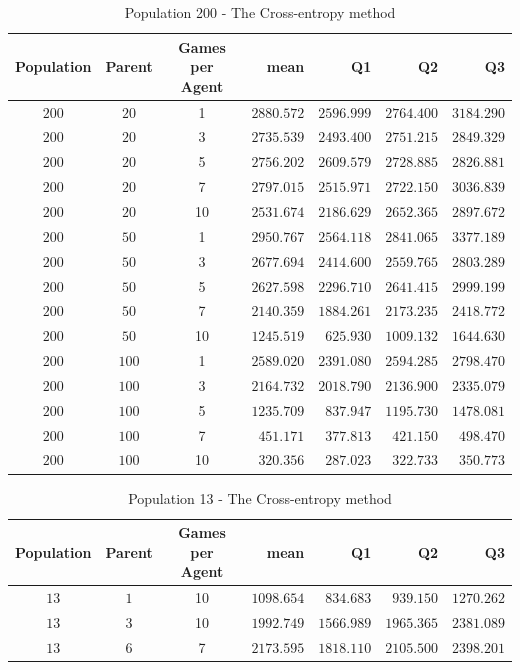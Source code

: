 \begin{table}[H]
\centering
\small
\begin{tabular}{c c c r r r r}
Population & Parent & Games per Agent & mean & Q1 & Q2 & Q3\\
\hline
\hdashline
$200$ & $20$ & 1 & $2880.572$ & $2596.999$ & $2764.400$ & $3184.290$\\
\hdashline
$200$ & $20$ & 3 & $2735.539$ & $2493.400$ & $2751.215$ & $2849.329$\\
$200$ & $20$ & 5 & $2756.202$ & $2609.579$ & $2728.885$ & $2826.881$\\
$200$ & $20$ & 7 & $2797.015$ & $2515.971$ & $2722.150$ & $3036.839$\\
$200$ & $20$ & 10 & $2531.674$ & $2186.629$ & $2652.365$ & $2897.672$\\
\hdashline
$200$ & $50$ & 1 & $2950.767$ & $2564.118$ & $2841.065$ & $3377.189$\\
\hdashline
$200$ & $50$ & 3 & $2677.694$ & $2414.600$ & $2559.765$ & $2803.289$\\
$200$ & $50$ & 5 & $2627.598$ & $2296.710$ & $2641.415$ & $2999.199$\\
$200$ & $50$ & 7 & $2140.359$ & $1884.261$ & $2173.235$ & $2418.772$\\
$200$ & $50$ & 10 & $1245.519$ & $625.930$ & $1009.132$ & $1644.630$\\
\hdashline
$200$ & $100$ & 1 & $2589.020$ & $2391.080$ & $2594.285$ & $2798.470$\\
\hdashline
$200$ & $100$ & 3 & $2164.732$ & $2018.790$ & $2136.900$ & $2335.079$\\
$200$ & $100$ & 5 & $1235.709$ & $837.947$ & $1195.730$ & $1478.081$\\
$200$ & $100$ & 7 & $451.171$ & $377.813$ & $421.150$ & $498.470$\\
$200$ & $100$ & 10 & $320.356$ & $287.023$ & $322.733$ & $350.773$\\
\end{tabular}
\caption{Population 200 - The Cross-entropy method}
\end{table}

\clearpage

\begin{table}[H]
\centering
\small
\begin{tabular}{c c c r r r r}
Population & Parent & Games per Agent & mean & Q1 & Q2 & Q3\\
\hline
$13$ & $1$ & 10 & $1098.654$ & $834.683$ & $939.150$ & $1270.262$\\
$13$ & $3$ & 10 & $1992.749$ & $1566.989$ & $1965.365$ & $2381.089$\\
$13$ & $6$ & 7 & $2173.595$ & $1818.110$ & $2105.500$ & $2398.201$\\
\end{tabular}
\caption{Population 13 - The Cross-entropy method}
\end{table}

